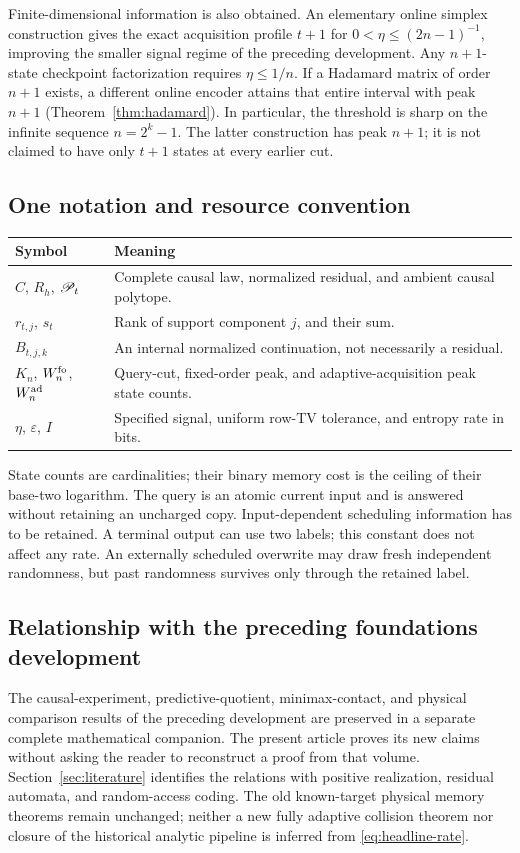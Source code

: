 Finite-dimensional information is also obtained. An elementary online
simplex construction gives the exact acquisition profile $t+1$ for
$0<\eta\le(2n-1)^{-1}$, improving the smaller signal regime of the
preceding development. Any $n+1$-state checkpoint factorization requires
$\eta\le1/n$. If a Hadamard matrix of order $n+1$ exists, a different
online encoder attains that entire interval with peak $n+1$
(Theorem~\ref{thm:hadamard}). In particular, the threshold is sharp on
the infinite sequence $n=2^k-1$. The latter construction has peak $n+1$;
it is not claimed to have only $t+1$ states at every earlier cut.

\subsection{One notation and resource convention}
\begin{center}
\begin{tabular}{@{}p{}p{}@{}}
\toprule
Symbol & Meaning\\
\midrule
$C$, $R_h$, $\mathscr P_t$ & Complete causal law, normalized residual, and ambient causal polytope.\\
$r_{t,j}$, $s_t$ & Rank of support component $j$, and their sum.\\
$B_{t,j,k}$ & An internal normalized continuation, not necessarily a residual.\\
$K_n$, $W_n^{\rm fo}$, $W_n^{\rm ad}$ & Query-cut, fixed-order peak, and adaptive-acquisition peak state counts.\\
$\eta$, $\varepsilon$, $I$ & Specified signal, uniform row-TV tolerance, and entropy rate in bits.\\
\bottomrule
\end{tabular}
\end{center}
State counts are cardinalities; their binary memory cost is the ceiling
of their base-two logarithm. The query is an atomic current input and is
answered without retaining an uncharged copy. Input-dependent scheduling
information has to be retained. A terminal output can use two labels;
this constant does not affect any rate. An externally scheduled overwrite
may draw fresh independent randomness, but past randomness survives only
through the retained label.

\subsection{Relationship with the preceding foundations development}
The causal-experiment, predictive-quotient, minimax-contact, and physical
comparison results of the preceding development \cite{GTF29} are preserved
in a separate complete mathematical companion. The present article proves
its new claims without asking the reader to reconstruct a proof from that
volume. Section~\ref{sec:literature} identifies the relations with positive
realization, residual automata, and random-access coding. The old
known-target physical memory theorems remain unchanged; neither a new
fully adaptive collision theorem nor closure of the historical analytic
pipeline is inferred from \eqref{eq:headline-rate}.
